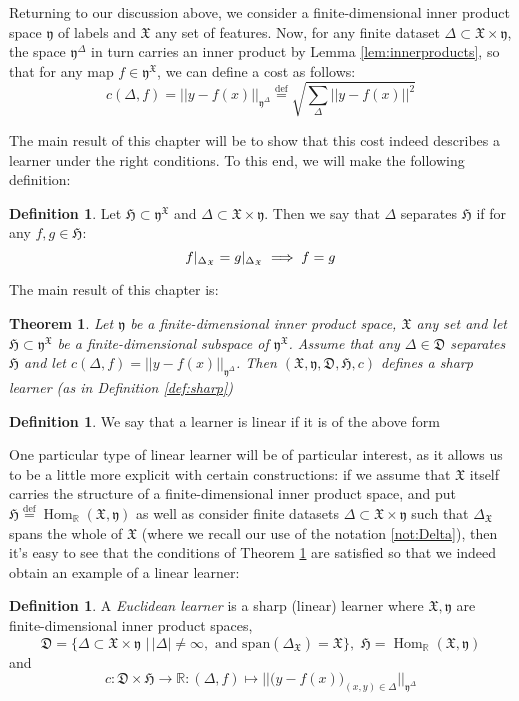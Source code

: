 \documentclass{book}
\theoremstyle{plain}
\newtheorem{theorem}[corollary]{Theorem}
\theoremstyle{definition}
\newtheorem{definition}[corollary]{Definition}
\renewcommand{\d}[1]{\mathbb{#1}}
\newcommand{\define}{\stackrel{\operatorname{def}}{=}}
\newcommand{\f}[1]{\mathfrak{#1}}
\newcommand{\fun}{\mapsto}
\DeclareMathOperator{\Hom}{Hom}
\newcommand{\mor}{\longrightarrow}
\begin{document}
Returning to our discussion above, we consider a finite-dimensional inner product space $\f{y}$ of labels and $\f{X}$ any set of features. Now, for any finite dataset $\Delta\subset \f{X}\times \f{y}$, the space $\f{y}^\Delta$ in turn carries an inner product by Lemma \ref{lem:innerproducts}, so that for any map $f \in \f{y}^\f{X}$, we can define a cost as follows:
\[
c(\Delta,f)=\vert \vert y-f(x)\vert\vert_{\f{y}^\Delta}\define\sqrt{\sum_{\Delta} \vert \vert y-f(x)\vert \vert^2}
\]

The main result of this chapter will be to show that this cost indeed describes a learner under the right conditions. To this end, we will make the following definition:
\begin{definition}
Let $\f{H}\subset \f{y}^\f{X}$ and $\Delta \subset \f{X}\times \f{y}$. Then we say that $\Delta$ separates $\f{H}$ if for any $f,g \in \f{H}$:
\[
f\arrowvert_{\Delta_{\f{X}}}=g\arrowvert_{{\Delta}_\f{X}}\implies f=g
\]
\end{definition}
The main result of this chapter is: 
\begin{theorem}\label{thm:linearlearner}
Let $\f{y}$ be a finite-dimensional inner product space, $\f{X}$ any set and let $\f{H}\subset \f{y}^\f{X}$ be a finite-dimensional subspace of $\f{y}^\f{X}$.  Assume that  any $\Delta \in \f{D}$ separates $\f{H}$ and let $c(\Delta,f)= \vert\vert y-f(x)\vert \vert_{\f{y}^\Delta}$. Then $(\f{X},\f{y},\f{D},\f{H},c)$ defines a sharp learner (as in Definition \ref{def:sharp})
\end{theorem}


\begin{definition}
We say that a learner is linear if it is of the above form
\end{definition}

One particular type of linear learner will be of particular interest, as it allows us to be a little more explicit with certain constructions: if we assume that $\f{X}$ itself carries the structure of a finite-dimensional inner product space, and put $\f{H}\define \Hom_{\d{R}}(\f{X},\f{y})$ as well as consider finite datasets $\Delta \subset \f{X}\times \f{y}$ such that $\Delta_{\f{X}}$ spans the whole of $\f{X}$
(where we recall our use of the notation \ref{not:Delta}), then it's easy to see that the conditions of Theorem \ref{thm:linearlearner} are satisfied so that we indeed obtain an example of a linear learner:


\begin{definition}\label{def:euclideanlearner}
A \emph{Euclidean learner} is a sharp (linear) learner where $\f{X},\f{y}$ are finite-dimensional inner product spaces, \[
\f{D} = \bigg\{ \Delta \subset \f{X}\times \f{y}\,\,\bigg\vert\,  \vert \Delta \vert \neq \infty , \textrm{ and span}(\Delta_{\f{X}}) = \f{X}\bigg\}
\text{,}\,\,\, \f{H}=\Hom_\d{R}(\f{X},\f{y})
\]
and 
\[
c:\f{D}\times \f{H}\mor \d{R}:(\Delta,f)\fun \vert \vert \big( y-f(x)\big)_{(x,y)\in \Delta} \vert \vert_{\f{y}^\Delta} 
\]
\end{definition}
\end{document}
